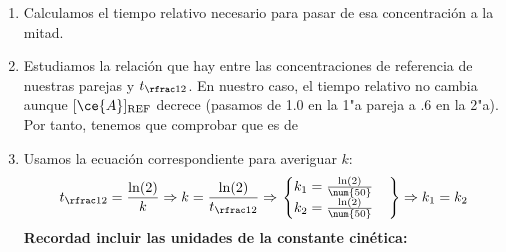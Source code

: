 \begin{frame}
\begin{enumerate}
		\item<3-> Calculamos el tiempo relativo necesario para pasar de esa concentración a la mitad.
		\item<4-> Estudiamos la relación que hay entre las concentraciones de referencia de nuestras parejas y $\tmedio$. En nuestro caso, el tiempo relativo no cambia aunque $[\ce{A}]_{\text{REF}}$ decrece (pasamos de \SI{1,0}{\Molar} en la 1"a pareja a \SI{,6}{\Molar} en la 2"a). Por tanto, tenemos que comprobar que es de 
		\item<5-> Usamos la ecuación correspondiente para averiguar $k$:
					$$
						\tmedio = \frac{\ln(2)}{k}\Rightarrow
						k = \frac{\ln(2)}{\tmedio}\Rightarrow
						\left.
							\begin{cases}
								k_1 = \frac{\ln(2)}{\num{50}}	\\
								k_2 = \frac{\ln(2)}{\num{50}}
							\end{cases}
						\right\}\Rightarrow
						k_1 = k_2
					$$
					\textbf{Recordad incluir las \textbf{unidades} de la \textbf{constante cinética}:}\\
					\begin{center}
						\qquad
					\end{center}
	\end{enumerate}
\end{frame}

